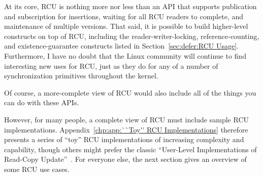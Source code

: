 At its core, RCU is nothing more nor less than an API that supports
publication and subscription for insertions, waiting for all RCU readers
to complete, and maintenance of multiple versions.
That said, it is possible to build higher-level constructs
on top of RCU, including the reader-writer-locking, reference-counting,
and existence-guarantee constructs listed in
Section~\ref{sec:defer:RCU Usage}.
Furthermore, I have no doubt that the Linux community will continue to
find interesting new uses for RCU,
just as they do for any of a number of synchronization
primitives throughout the kernel.

Of course, a more-complete view of RCU would also include
all of the things you can do with these APIs.

However, for many people, a complete view of RCU must include sample
RCU implementations.
Appendix~\ref{chp:app:``Toy'' RCU Implementations} therefore presents a series
of ``toy'' RCU implementations of increasing complexity and capability,
though others might prefer the classic
``User-Level Implementations of Read-Copy
Update''~\cite{MathieuDesnoyers2012URCU}.
For everyone else, the next section gives an overview of some RCU use cases.
